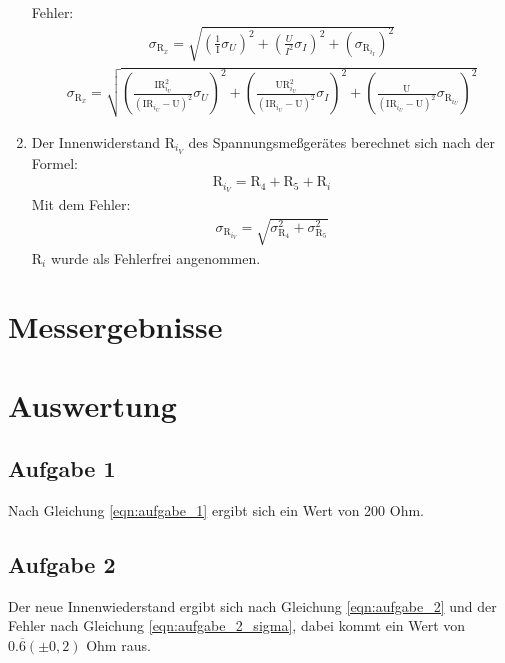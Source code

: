 \documentclass[12pt]{scrartcl}
\begin{document}
\begin{enumerate}
	Fehler:
	\begin{align}
	\sigma_{\text{R}_x}=
	\sqrt{\left(\frac{1}								{\text{I}}\sigma_U\right)^2+
	\left(\frac{U}{I^2}\sigma_I\right)^2+
	\left(\sigma_{\text{R}_{i_I}}\right)^2}
	\label{eqn:aufgabe_3_schaltung_2_sigma}
	\end{align}		
	\begin{align}
	\sigma_{\text{R}_x}=
	\sqrt{\left(\frac{\text{I}
	\text{R}_{i_U}^2}								{(\text{I}\text{R}_{i_U}-
	\text{U})^2}\sigma_U\right)^2+
	\left(\frac{\text{U}\text{R}_{i_U}^2}			{(\text{I}\text{R}_{i_U}-
	\text{U})^2}\sigma_I\right)^2+
	\left(\frac{\text{U}}							{(\text{I}\text{R}_{i_U}-
	\text{U})^2}\sigma_{
	\text{R}_{i_U}}\right)^2}
	\label{eqn:aufgabe_3_schaltung_1_sigma}
	\end{align}	 
	\item
	Der Innenwiderstand R$_{i_V}$ des Spannungsmeßgerätes berechnet sich nach der Formel:
	\begin{align}
	\text{R}_{i_V} = \text{R}_4 + \text{R}_5 + \text{R}_i 
	\label{eqn:aufgabe_4}
	\end{align}
	Mit dem Fehler:
	\begin{align}
	\sigma_{\text{R}_{i_V}} = \sqrt{\sigma_{\text{R}_4}^2 + \sigma_{\text{R}_5}^2}
	\label{eqn:aufgabe_4_sigma}
	\end{align}
	R$_i$ wurde als Fehlerfrei angenommen.
	
\end{enumerate}


\section{Messergebnisse}



\section{Auswertung}

\subsection{Aufgabe 1}
Nach Gleichung \ref{eqn:aufgabe_1} ergibt sich ein Wert von 200 Ohm.

\subsection{Aufgabe 2}
Der neue Innenwiederstand ergibt sich nach Gleichung \ref{eqn:aufgabe_2} und der Fehler nach Gleichung \ref{eqn:aufgabe_2_sigma}, dabei kommt ein Wert von $0.\overline{6}(\pm 0,2)$ Ohm raus.
\end{document}
